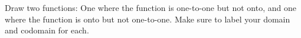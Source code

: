 \documentclass[a4paper,12pt]{book}
\newcounter{question}
\begin{document}
    \begin{questionNOGRADE}{\thequestion}
    
        Draw two functions: One where the function is one-to-one but not onto,
        and one where the function is onto but not one-to-one.
        Make sure to label your domain and codomain for each.

        
    \end{questionNOGRADE}


\newpage
    
\end{document}
